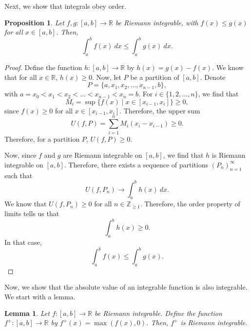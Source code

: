 \documentclass[a4paper, openany]{memoir}
\theoremstyle{definition}
\theoremstyle{plain}
\newtheorem{lemma}[definition]{Lemma}
\newtheorem{proposition}[definition]{Proposition}
\begin{document}
\noindent Next, we show that integrals obey order.
\begin{proposition}
Let $f, g: [a, b] \to \mathbb{R}$ be Riemann integrable, with $f(x) \leqslant g(x)$ for all $x \in [a, b]$. Then,
\[\int_a^b f(x) \ dx \leqslant \int_a^b g(x) \ dx.\]
\end{proposition}
\begin{proof}
Define the function $h: [a, b] \to \mathbb{R}$ by $h(x) = g(x) - f(x)$. We know that for all $x \in \mathbb{R}$, $h(x) \geqslant 0$. Now, let $P$ be a partition of $[a, b]$. Denote 
\[P = \{a, x_1, x_2, \dots, x_{n-1}, b\},\]
with $a = x_0 < x_1 < x_2 < \dots < x_{n-1} < x_n = b$. For $i \in \{1, 2, \dots, n\}$, we find that
\[M_i = \sup \{f(x) \mid x \in [x_{i-1}, x_i]\} \geqslant 0,\]
since $f(x) \geqslant 0$ for all $x \in [x_{i-1}, x_i]$. Therefore, the upper sum
\[U(f, P) = \sum_{i=1}^n M_i (x_i - x_{i-1}) \geqslant 0.\]
Therefore, for a partition $P$, $U(f, P) \geqslant 0$.

\noindent Now, since $f$ and $g$ are Riemann integrable on $[a, b]$, we find that $h$ is Riemann integrable on $[a, b]$. Therefore, there exists a sequence of partitions $(P_n)_{n=1}^{\infty}$ such that
\[U(f, P_n) \to \int_a^b h(x) \ dx.\]
We know that $U(f, P_n) \geqslant 0$ for all $n \in \mathbb{Z}_{\geqslant 1}$. Therefore, the order property of limits tells us that
\[\int_a^b h(x) \geqslant 0.\]
In that case,
\[\int_a^b f(x) \leqslant \int_a^b g(x).\]
\end{proof}
\noindent Now, we show that the absolute value of an integrable function is also integrable. We start with a lemma.
\begin{lemma}
Let $f: [a, b] \to \mathbb{R}$ be Riemann integrable. Define the function $f^+: [a, b] \to \mathbb{R}$ by $f^+(x) = \max(f(x), 0)$. Then, $f^+$ is Riemann integrable.
\end{lemma}
\end{document}
